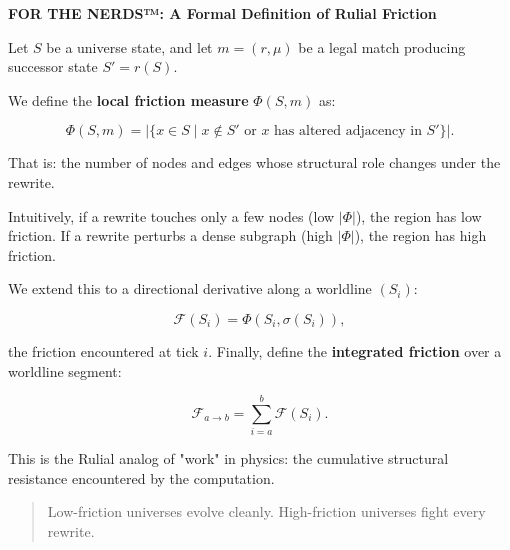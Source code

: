 \begin{mdframed}[linewidth=1pt, linecolor=black!50, innertopmargin=8pt, innerbottommargin=8pt]
\noindent\textbf{FOR THE NERDS™: A Formal Definition of Rulial Friction}

\medskip

Let $S$ be a universe state, and let $m = (r, \mu)$ be a legal match producing successor
state $S' = r(S)$.

We define the \textbf{local friction measure} $\Phi(S, m)$ as:

\[
\Phi(S, m)
= \left| \{ x \in S \;|\; x \notin S' \text{ or } x \text{ has altered adjacency in } S' \} \right|.
\]

That is: the number of nodes and edges whose structural role changes under the rewrite.

Intuitively, if a rewrite touches only a few nodes (low $|\Phi|$), the region has low friction. If a rewrite perturbs a dense subgraph (high $|\Phi|$), the region has high friction.

We extend this to a directional derivative along a worldline $(S_i)$:

\[
\mathcal{F}(S_i)
= \Phi(S_i, \sigma(S_i)),
\]

the friction encountered at tick $i$. Finally, define the \textbf{integrated friction} over a worldline segment:

\[
\mathcal{F}_{a \to b}
= \sum_{i=a}^{b} \mathcal{F}(S_i).
\]

This is the Rulial analog of "work" in physics:
the cumulative structural resistance encountered by the computation.

\begin{quote}
Low-friction universes evolve cleanly.
High-friction universes fight every rewrite.
\end{quote}

\end{mdframed}


